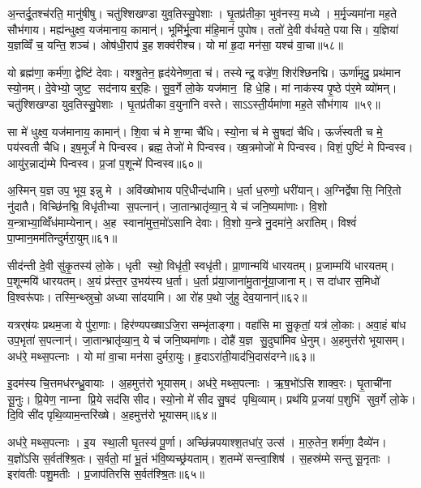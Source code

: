 अ॒न्तर्दू॒तश्च॑रति॒ मानु॑षीषु। चतु॑श्शिखण्डा युव॒तिस्सु॒पेशाः। घृ॒तप्र॑तीका॒ भुव॑नस्य॒ मध्ये। म॒र्मृ॒ज्यमा॑ना मह॒ते सौभ॑गाय। मह्य॑न्धुक्ष्व॒ यज॑मानाय॒ कामान्॑। भूमि॑र्भू॒त्वा म॑हि॒मानं॑ पुपोष। ततो॑ दे॒वी व॑र्धयते॒ पयासि। य॒ज्ञिया॑ य॒ज्ञव्विँ च॒ यन्ति॒ शञ्च॑। ओष॑धी॒राप॑ इ॒ह शक्व॑रीश्च। यो मा॑ हृ॒दा मन॑सा॒ यश्च॑ वा॒चा॥५८॥

यो ब्रह्म॑णा॒ कर्म॑णा॒ द्वेष्टि॑ देवाः। यश्श्रु॒तेन॒ हृद॑येनेष्ण॒ता च॑। तस्येन्द्र॒ वज्रे॑ण॒ शिर॑श्छिनद्मि। ऊर्णा॑मृदु॒ प्रथ॑मान स्यो॒नम्। दे॒वेभ्यो॒ जुष्ट॒ सद॑नाय ब॒र्॒हिः। सु॒व॒र्गे लो॒के यज॑मान॒ हि धे॒हि। मां नाक॑स्य पृ॒ष्ठे प॑र॒मे व्यो॑मन्। चतु॑श्शिखण्डा युव॒तिस्सु॒पेशाः। घृ॒तप्र॑तीका व॒युना॑नि वस्ते। साऽऽस्ती॒र्यमा॑णा मह॒ते सौभ॑गाय ॥५९॥

सा मे॑ धुक्ष्व॒ यज॑मानाय॒ कामान्॑। शि॒वा च॑ मे श॒ग्मा चै॑धि। स्यो॒ना च॑ मे सु॒षदा॑ चैधि। ऊर्ज॑स्वती च मे॒ पय॑स्वती चैधि। इष॒मूर्जं॑ मे पिन्वस्व। ब्रह्म॒ तेजो॑ मे पिन्वस्व। ख्ष॒त्रमोजो॑ मे पिन्वस्व। विशं॒ पुष्टिं॑ मे पिन्वस्व। आयु॑र॒न्नाद्य॑म्मे पिन्वस्व। प्र॒जां प॒शून्मे॑ पिन्वस्व॥६०॥

अ॒स्मिन् य॒ज्ञ उप॒ भूय॒ इन्नु मे। अवि॑ख्षोभाय परि॒धीन्द॑धामि। ध॒र्ता ध॒रुणो॒ धरी॑यान्। अ॒ग्निर्द्वेषासि॒ निरि॒तो नु॑दातै। विच्छि॑नद्मि॒ विधृ॑तीभ्या स॒पत्नान्॑। जा॒तान्भ्रातृ॑व्या॒न्॒ ये च॑ जनि॒ष्यमा॑णाः। वि॒शो य॒न्त्राभ्या॒व्विँध॑माम्येनान्। अ॒ह स्वाना॑मुत्त॒मो॑ऽसानि देवाः। वि॒शो य॒न्त्रे नु॒दमा॑ने॒ अरा॑तिम्। विश्वं॑ पा॒प्मान॒मम॑तिन्दुर्मरा॒युम्॥६१॥

सीद॑न्ती दे॒वी सु॑कृ॒तस्य॑ लो॒के। धृती स्थो॒ विधृ॑ती॒ स्वधृ॑ती। प्रा॒णान्मयि॑ धारयतम्। प्र॒जाम्मयि॑ धारयतम्। प॒शून्मयि॑ धारयतम्। अ॒यं प्र॑स्त॒र उ॒भय॑स्य ध॒र्ता। ध॒र्ता प्र॑या॒जाना॑मु॒तानू॑या॒जानाम्। स दा॑धार स॒मिधो॑ वि॒श्वरू॑पाः। तस्मि॒न्थ्स्रुचो॒ अध्या सा॑दयामि। आ रो॑ह प॒थो जु॑हु देव॒यानान्॑॥६२॥

यत्रर्‌ष॑यः प्रथम॒जा ये पु॑रा॒णाः। हिर॑ण्यपख्षाऽजि॒रा सम्भृ॑ताङ्गा। वहा॑सि मा सु॒कृतां॒ यत्र॑ लो॒काः। अवा॒हं बा॑ध उप॒भृता॑ स॒पत्नान्॑। जा॒तान्भ्रातृ॑व्या॒न्॒ ये च॑ जनि॒ष्यमा॑णाः। दोहै॑ य॒ज्ञ सु॒दुघा॑मिव धे॒नुम्। अ॒हमुत्त॑रो भूयासम्। अध॑रे॒ मथ्स॒पत्नाः। यो मा॑ वा॒चा मन॑सा दुर्मरा॒युः। हृ॒दाऽरा॑ती॒याद॑भि॒दास॑दग्ने॥६३॥

इ॒दम॑स्य चि॒त्तमध॑रन्ध्रु॒वायाः। अ॒हमुत्त॑रो भूयासम्। अध॑रे॒ मथ्स॒पत्नाः। ऋ॒ष॒भो॑ऽसि शाक्व॒रः। घृ॒ताची॑ना सू॒नुः। प्रि॒येण॒ नाम्ना प्रि॒ये सद॑सि सीद। स्यो॒नो मे॑ सीद सु॒षद॑ पृथि॒व्याम्। प्रथ॑यि प्र॒जया॑ प॒शुभि॑ सुव॒र्गे लो॒के। दि॒वि सी॑द पृथि॒व्याम॒न्तरि॑ख्षे। अ॒हमुत्त॑रो भूयासम्॥६४॥

अध॑रे॒ मथ्स॒पत्नाः। इ॒य स्था॒ली घृ॒तस्य॑ पू॒र्णा। अच्छि॑न्नपयाश्श॒तधा॑र॒ उत्स॑। मा॒रु॒तेन॒ शर्म॑णा॒ दैव्ये॑न। य॒ज्ञो॑ऽसि स॒र्वत॑श्श्रि॒तः। स॒र्वतो॒ मां भू॒तं भ॑वि॒ष्यच्छ्र॑यताम्। श॒तम्मे॑ सन्त्वा॒शिष॑। स॒हस्र॑म्मे सन्तु सू॒नृताः। इरा॑वतीः पशु॒मतीः। प्र॒जाप॑तिरसि स॒र्वत॑श्श्रि॒तः॥६५॥

